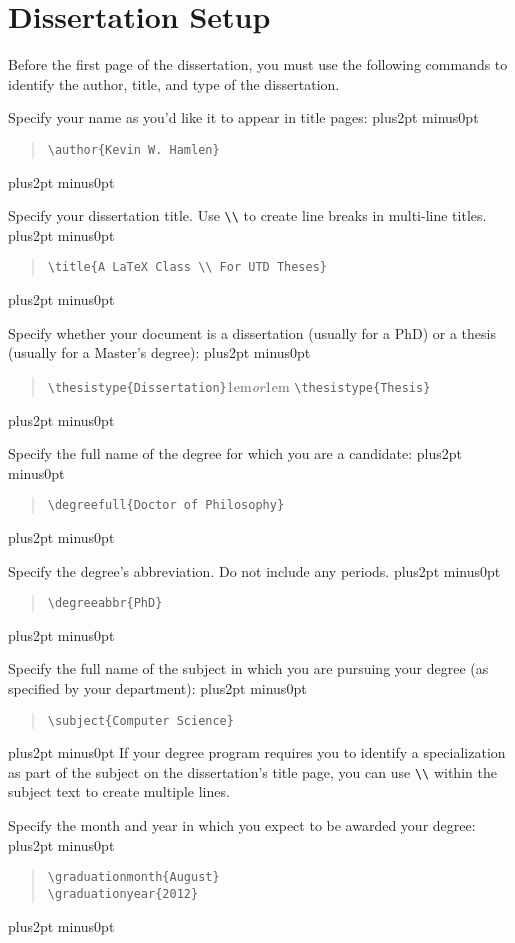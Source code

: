 \documentclass[doublespacing]{utdthesis}
\newenvironment{exampleclasscode}
 {\parindent=1cm\vskip0pt plus2pt minus0pt\begin{verse}}
 {\end{verse}\vskip0pt plus2pt minus0pt}
\begin{document}
\section{Dissertation Setup}
\label{s:setup}

Before the first page of the dissertation, you must use the following commands
to identify the author, title, and type of the dissertation.

Specify your name as you'd like it to appear in title pages:
\begin{exampleclasscode}
\verb|\author{Kevin W. Hamlen}|
\end{exampleclasscode}

Specify your dissertation title.
Use \verb|\\| to create line breaks in multi-line titles.
\begin{exampleclasscode}
\verb|\title{A LaTeX Class \\ For UTD Theses}|
\end{exampleclasscode}

Specify whether your document is a dissertation (usually for a PhD) or a
thesis (usually for a Master's degree):
\begin{exampleclasscode}
\verb|\thesistype{Dissertation}|\kern1em\textit{or}\kern1em
\verb|\thesistype{Thesis}|
\end{exampleclasscode}

Specify the full name of the degree for which you are a candidate:
\begin{exampleclasscode}
\verb|\degreefull{Doctor of Philosophy}|
\end{exampleclasscode}

Specify the degree's abbreviation.
Do not include any periods.
\begin{exampleclasscode}
\verb|\degreeabbr{PhD}|
\end{exampleclasscode}

Specify the full name of the subject in which you are pursuing your degree
(as specified by your department):
\begin{exampleclasscode}
\verb|\subject{Computer Science}|
\end{exampleclasscode}
If your degree program requires you to identify a specialization as part of
the subject on the dissertation's title page, you can use \verb|\\| within
the subject text to create multiple lines.

Specify the month and year in which you expect to be awarded your degree:
\begin{exampleclasscode}
\verb|\graduationmonth{August}| \\
\verb|\graduationyear{2012}|
\end{exampleclasscode}
\end{document}
